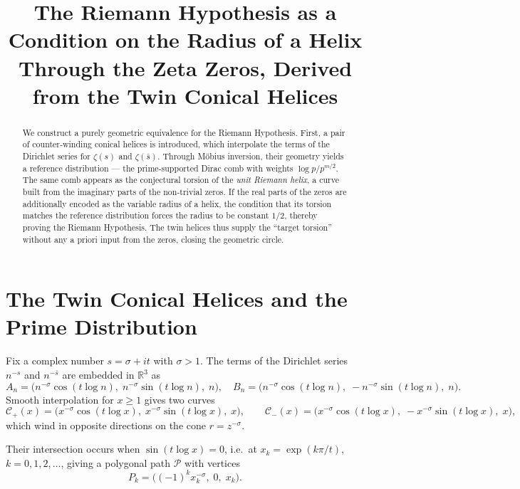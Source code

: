 \documentclass[12pt,a4paper]{article}
\title{\bf The Riemann Hypothesis as a Condition on the Radius of a Helix\\ Through the Zeta Zeros, Derived from the Twin Conical Helices}
\author{}
\date{}
\newcommand{\R}{\mathbb{R}}
\begin{document}
\maketitle

\begin{abstract}
We construct a purely geometric equivalence for the Riemann Hypothesis.  First, a pair of counter‑winding conical helices is introduced, which interpolate the terms of the Dirichlet series for $\zeta(s)$ and $\zeta(\bar s)$.  Through M\"obius inversion, their geometry yields a reference distribution — the prime‑supported Dirac comb with weights $\log p/p^{m/2}$.  The same comb appears as the conjectural torsion of the \emph{unit Riemann helix}, a curve built from the imaginary parts of the non‑trivial zeros.  If the real parts of the zeros are additionally encoded as the variable radius of a helix, the condition that its torsion matches the reference distribution forces the radius to be constant $1/2$, thereby proving the Riemann Hypothesis.  The twin helices thus supply the ``target torsion'' without any a priori input from the zeros, closing the geometric circle.
\end{abstract}

\section{The Twin Conical Helices and the Prime Distribution}

Fix a complex number $s = \sigma + i t$ with $\sigma > 1$.  The terms of the Dirichlet series $n^{-s}$ and $n^{-\bar s}$ are embedded in $\R^3$ as
\[
A_n = \bigl( n^{-\sigma}\cos(t\log n),\; n^{-\sigma}\sin(t\log n),\; n \bigr),\quad
B_n = \bigl( n^{-\sigma}\cos(t\log n),\; -n^{-\sigma}\sin(t\log n),\; n \bigr).
\]
Smooth interpolation for $x\ge 1$ gives two curves
\begin{equation}\label{twin}
\mathcal{C}_+(x) = \bigl( x^{-\sigma}\cos(t\log x),\; x^{-\sigma}\sin(t\log x),\; x \bigr),\qquad
\mathcal{C}_-(x) = \bigl( x^{-\sigma}\cos(t\log x),\; -x^{-\sigma}\sin(t\log x),\; x \bigr),
\end{equation}
which wind in opposite directions on the cone $r = z^{-\sigma}$.

Their intersection occurs when $\sin(t\log x)=0$, i.e.\ at $x_k = \exp(k\pi/t)$, $k=0,1,2,\dots$, giving a polygonal path $\mathcal{P}$ with vertices
\[
P_k = \bigl( (-1)^k x_k^{-\sigma},\; 0,\; x_k \bigr).
\]
\end{document}
